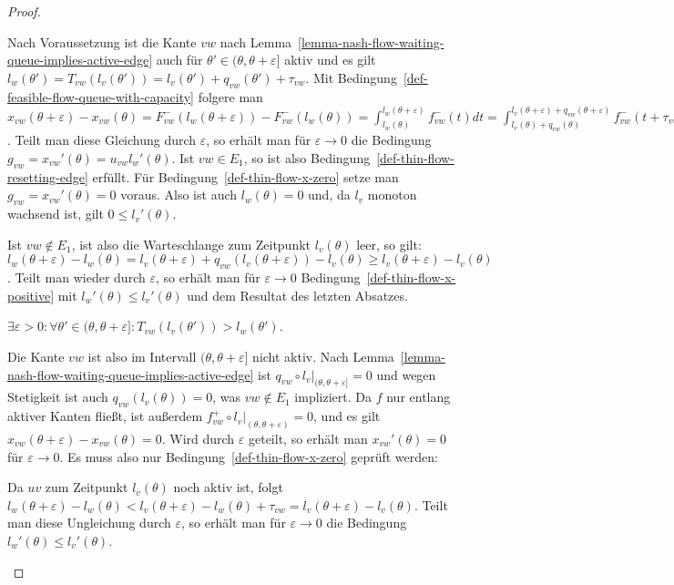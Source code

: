 \begin{proof}
\begin{description}[leftmargin=0cm, topsep=0cm, itemindent=\parindent]
		Nach Voraussetzung ist die Kante ${vw}$ nach Lemma~\ref{lemma-nash-flow-waiting-queue-implies-active-edge} auch für $\theta'\in  (\theta, \theta + \varepsilon ]$ aktiv und es gilt $l_w(\theta') = T_{vw}(l_v(\theta')) = l_v(\theta') + q_{vw}(\theta') + \tau_{vw}$.
		Mit Bedingung~\ref{def-feasible-flow-queue-with-capacity} folgere man $x_{vw}(\theta + \varepsilon) - x_{vw}(\theta) = F_{vw}^-(l_w(\theta + \varepsilon)) - F_{vw}^-(l_w(\theta))
		= \int_{l_w(\theta)}^{l_w(\theta + \varepsilon)} f_{vw}^-(t) dt
		= \int_{l_v(\theta) + q_{vw}(\theta)}^{l_v(\theta + \varepsilon) + q_{vw}(\theta + \varepsilon)} f_{vw}^-(t + \tau_{vw}) dt
		= u_{vw} (l_w(\theta + \varepsilon) - l_w(\theta))$.
		Teilt man diese Gleichung durch $\varepsilon$, so erhält man für $\varepsilon\rightarrow 0$ die Bedingung $g_{vw} = x_{vw}'(\theta) = u_{vw} l_w'(\theta)$.
		Ist $vw\in E_1$, so ist also Bedingung~\ref{def-thin-flow-resetting-edge} erfüllt.
		Für Bedingung~\ref{def-thin-flow-x-zero} setze man $g_{vw}=x_{vw}'(\theta)=0$ voraus.
		Also ist auch $l_w(\theta)=0$ und, da $l_v$ monoton wachsend ist, gilt $0 \leq l_v'(\theta)$.

		Ist $vw\notin E_1$, ist also die Warteschlange zum Zeitpunkt $l_v(\theta)$ leer, so gilt: $l_w(\theta+\varepsilon) - l_w(\theta) = l_v(\theta + \varepsilon) + q_{vw}(l_v(\theta + \varepsilon)) - l_v(\theta) \geq l_v(\theta + \varepsilon) - l_v(\theta)$.
		Teilt man wieder durch $\varepsilon$, so erhält man für $\varepsilon  \rightarrow 0$ Bedingung~\ref{def-thin-flow-x-positive} mit $l_w'(\theta) \leq l_v'(\theta)$ und dem Resultat des letzten Absatzes.
		
		\item[2. Fall:] $\exists \varepsilon > 0: \forall \theta'\in(\theta, \theta + \varepsilon]: T_{vw}(l_v(\theta'))>l_w(\theta')$.
		
		Die Kante ${vw}$ ist also im Intervall $(\theta, \theta + \varepsilon]$ nicht aktiv.
		Nach Lemma~\ref{lemma-nash-flow-waiting-queue-implies-active-edge} ist $q_{vw} \circ l_v\big|_{(\theta, \theta+\varepsilon]}=0$ und wegen Stetigkeit ist auch $q_{vw}(l_v(\theta))=0$, was $vw\notin E_1$ impliziert.
		Da $f$ nur entlang aktiver Kanten fließt, ist außerdem $f_{vw}^+ \circ l_v \big|_{(\theta, \theta+\varepsilon)} = 0$, und es gilt $x_{vw}(\theta + \varepsilon) - x_{vw}(\theta)=0$.
		Wird durch $\varepsilon$ geteilt, so erhält man $x_{vw}'(\theta) = 0$ für $\varepsilon\rightarrow0$.
		Es muss also nur Bedingung~\ref{def-thin-flow-x-zero} geprüft werden:
		
		Da $uv$ zum Zeitpunkt $l_v(\theta)$ noch aktiv ist, folgt $l_w(\theta + \varepsilon) - l_w(\theta) < l_v(\theta+\varepsilon) - l_w(\theta) + \tau_{vw} = l_v(\theta + \varepsilon) - l_v(\theta)$.
		Teilt man diese Ungleichung  durch $\varepsilon$, so erhält man für $\varepsilon\rightarrow 0$ die Bedingung $l_w'(\theta)\leq l_v'(\theta)$.
		

\end{description}
\end{proof}
